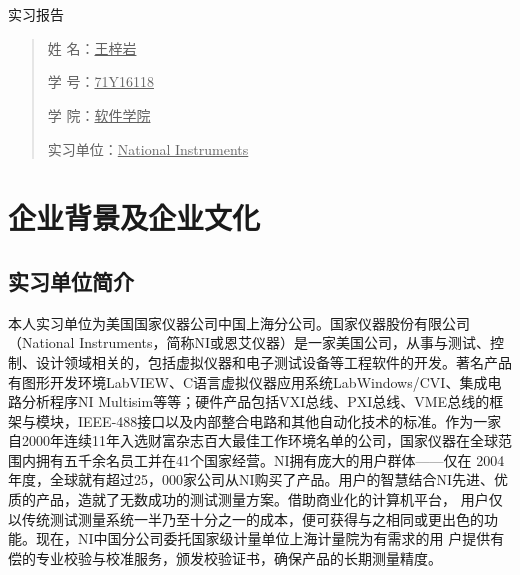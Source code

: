 \documentclass[UTF8]{ctexart}
\begin{document}
\nocite{*}%

	\begin{center}
		\quad \\
		\quad \\
		\vskip 3.5cm
		\heiti \fontsize{45}{17} 实习报告
		\vskip 3.5cm
	\end{center}
	\vskip 3.5cm
	\begin{quotation}
		\heiti \fontsize{36}{17}
		\doublespacing
		\par\setlength\parindent{12em}
		\quad 
		\heiti		
		
		姓\hspace{0.61cm} 名：\underline{王梓岩}
		
		学\hspace{0.61cm} 号：\underline{71Y16118}

		学\hspace{0.61cm} 院：\underline{软件学院}
		
		实习单位：\underline{National Instruments}
		
		\vskip 2cm
		\centering
	\end{quotation}
	
\newpage
\songti \fontsize{13}{13}
\large

\section{企业背景及企业文化}
\subsection{实习单位简介}
本人实习单位为美国国家仪器公司中国上海分公司。国家仪器股份有限公司（National Instruments，简称NI或恩艾仪器）是一家美国公司，从事与测试、控
制、设计领域相关的，包括虚拟仪器和电子测试设备等工程软件的开发。著名产品有图形开发环境LabVIEW、C语言虚拟仪器应用系统LabWindows/CVI、集成电
路分析程序NI Multisim等等；硬件产品包括VXI总线、PXI总线、VME总线的框架与模块，IEEE-488接口以及内部整合电路和其他自动化技术的标准。作为一家
自2000年连续11年入选财富杂志百大最佳工作环境名单的公司，国家仪器在全球范围内拥有五千余名员工并在41个国家经营。NI拥有庞大的用户群体——仅在
2004年度，全球就有超过25，000家公司从NI购买了产品。用户的智慧结合NI先进、优质的产品，造就了无数成功的测试测量方案。借助商业化的计算机平台，
用户仅以传统测试测量系统一半乃至十分之一的成本，便可获得与之相同或更出色的功能。现在，NI中国分公司委托国家级计量单位上海计量院为有需求的用
户提供有偿的专业校验与校准服务，颁发校验证书，确保产品的长期测量精度。
\end{document}
